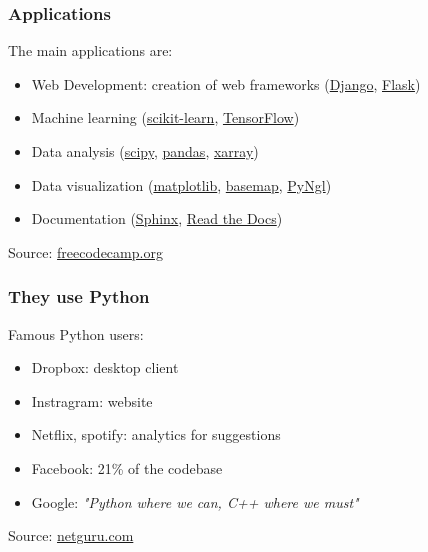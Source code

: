 \begin{frame}[fragile]
\frametitle{Applications}

The main applications are:
\vspace{1em}

\begin{itemize}
\item{Web Development: creation of web frameworks (\href{https://www.djangoproject.com/}{Django}, \href{https://www.palletsprojects.com/p/flask/}{Flask})}
\item{Machine learning (\href{https://scikit-learn.org/}{scikit-learn}, \href{https://www.tensorflow.org/}{TensorFlow})}
\item{Data analysis (\href{https://www.scipy.org/}{scipy}, \href{https://pandas.pydata.org/}{pandas}, \href{http://xarray.pydata.org/en/stable/}{xarray})}
\item{Data visualization (\href{http://xarray.pydata.org/en/stable/}{matplotlib}, \href{https://matplotlib.org/basemap/}{basemap}, \href{https://www.pyngl.ucar.edu/}{PyNgl})}
\item{Documentation (\href{https://www.sphinx-doc.org/en/master/}{Sphinx}, \href{https://readthedocs.org/}{Read the Docs})}
\end{itemize}
\vspace{1em}
Source: \href{https://www.freecodecamp.org/news/what-can-you-do-with-python-the-3-main-applications-518db9a68a78/}{freecodecamp.org}
\end{frame}

\begin{frame}[fragile]
\frametitle{They use Python}

Famous Python users:
\vspace{1em}

\begin{itemize}
\item{Dropbox: desktop client}
\item{Instragram: website}
\item{Netflix, spotify: analytics for suggestions}
\item{Facebook: 21\% of the codebase}
\item{Google: \emph{"Python where we can, C++ where we must"}}
\end{itemize}
\vspace{1em}
Source: \href{https://www.netguru.com/blog/8-top-companies-that-use-python-for-their-apps-examples-of-top-notch-python-applications}{netguru.com}

\end{frame}

